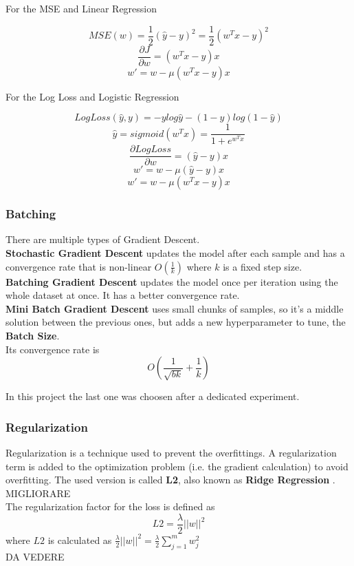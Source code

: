 \documentclass[
	letterpaper, %
	10pt, %
]{class}
\begin{document}
For the MSE and Linear Regression

$$ MSE(w) = \frac{1}{2} (\hat{y} - y)^2 = \frac{1}{2} (w^Tx - y)^2 $$
$$\frac{\partial J}{\partial w} = (w^T x - y)x $$
$$ w' = w - \mu (w^T x -y)x $$

For the Log Loss and Logistic Regression

$$ LogLoss(\hat{y}, y) = -y log \hat{y} - (1-y)log(1- \hat{y})$$
$$ \hat{y} = sigmoid(w^Tx) = \frac{1}{1 + e^{w^Tx}} $$
$$ \frac{\partial LogLoss}{\partial w} = (\hat{y} - y)x $$
$$ w' = w - \mu (\hat{y} - y)x $$
$$ w' = w - \mu (w^T x -y)x $$

\subsubsection{Batching}
There are multiple types of Gradient Descent.\\

\textbf{Stochastic Gradient Descent} updates the model after each sample and has a convergence rate that is non-linear $O(\frac{1}{k})$ where $k$ is a fixed step size.\\

\textbf{Batching Gradient Descent} updates the model once per iteration using the whole dataset at once. It has a better convergence rate.\\

\textbf{Mini Batch Gradient Descent} \cite{batching} uses small chunks of samples, so it's a middle solution between the previous ones, but adds a new hyperparameter to tune, the \textbf{Batch Size}.\\
Its convergence rate is
$$O(\frac{1}{\sqrt{bk}} + \frac{1}{k})$$

In this project the last one was choosen after a dedicated experiment.

\subsubsection{Regularization}
Regularization is a technique used to prevent the overfittings. A regularization term is added to the optimization problem (i.e. the gradient calculation) to avoid overfitting.
The used version is called \textbf{L2}, also known as \textbf{Ridge Regression} \cite{l2}. MIGLIORARE\\

The regularization factor for the loss is defined as
$$ L2 = \frac{\lambda}{2}||w||^2 $$
where $L2$ is calculated as $ \frac{\lambda}{2}||w||^2 = \frac{\lambda}2{\displaystyle\sum_{j=1}^m w_j^2} $ \\
DA VEDERE
\end{document}
